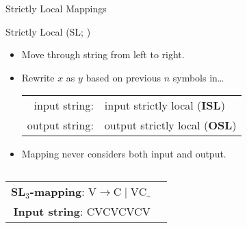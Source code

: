 \documentclass[xcolor={usenames,svgnames,x11names,table}]{beamer}
\begin{document}
\begin{frame}{Strictly Local Mappings}
    \begin{block}{Strictly Local (SL; \citealp{Chandlee14})}
        \begin{itemize}
            \item Move through string from left to right.
            \item Rewrite $x$ as $y$ based on previous $n$ symbols in\ldots
                \begin{center}
                    \begin{tabular}{rl}
                        input string: & input strictly local (\textbf{ISL})\\
                        output string: & output strictly local (\textbf{OSL})\\
                    \end{tabular}
                \end{center}
            \item Mapping never considers both input and output.\\
        \end{itemize}
    \end{block}
    \begin{example}
        \begin{columns}
            \begin{center}
                \begin{tabular}{rl}
                    \textbf{SL$_3$-mapping}: $\text{V} \rightarrow \text{C} \mid \text{VC} \_$\\
                    \textbf{Input string}: CVCVCVCV
                \end{tabular}
            \end{center}
            

\end{columns}
\end{example}
\end{frame}
\end{document}
